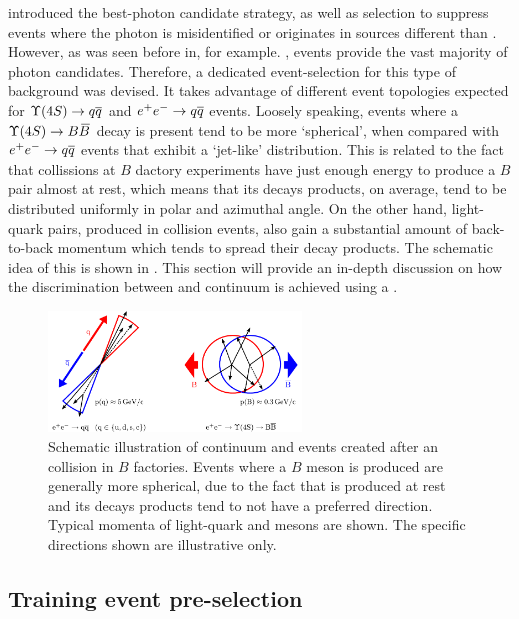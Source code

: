  introduced the best-photon candidate strategy, 
as well as selection to suppress events 
where the photon is misidentified or originates in sources different than \BtoXsgamma.
However, as was seen before in, for example. ,
\epem\ra\qqbar events provide the vast majority of photon candidates.
Therefore, a dedicated event-selection for this type of background was devised.
It takes advantage of  different event topologies expected for $\FourS\to\qqbar$ and $e^+e^-\rightarrow q\overline q$ events.
Loosely speaking, events where a $\FourS\to\BB$ decay is present tend to be more `spherical', when compared with $e^+e^-\rightarrow q\overline q$ events that exhibit a `jet-like' distribution.
This is related to the fact that \epem collissions at $B$ dactory experiments have just enough energy to produce a $B$ pair almost at rest, which means that its decays products, on average, tend to be distributed uniformly in polar and azimuthal angle.
On the other hand, light-quark pairs, produced in \epem collision events, also gain a substantial amount of back-to-back momentum which tends to spread their decay products. 
The schematic idea of this is shown in .
This section will provide an in-depth discussion on how the discrimination between \BtoXsgamma and continuum is achieved using a \BDT.

\begin{figure}[htbp!]
    \centering
    \includegraphics[width=0.6\textwidth]{figures/continuum_suppression/figure_continuum_suppression_event_shapes.pdf}
    \caption{\label{fig:continuum_schematic} Schematic illustration of continuum and \BB events created after an \epem collision in $B$ factories.
    Events where a $B$ meson is produced are generally more spherical, due to the fact that \FourS is produced at rest and its decays products tend to not have a preferred direction.
    Typical momenta of light-quark and \BB mesons are shown.
    The specific directions shown are illustrative only. 
    }
\end{figure}

\subsection{Training event pre-selection}\label{sec:preselection}

